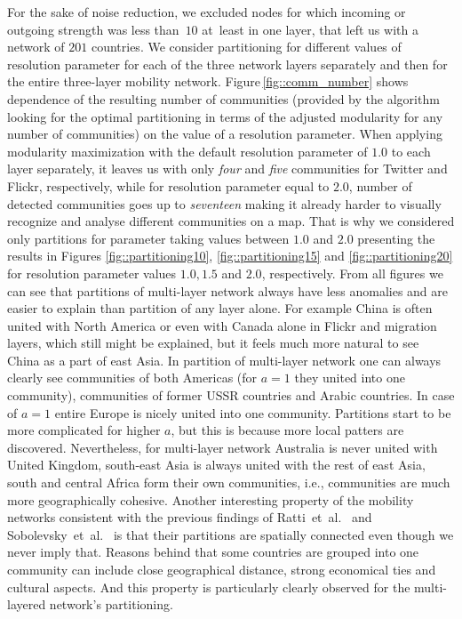 \documentclass[aps,superscriptaddress,showkeys,nofootinbib]{revtex4-1}
\begin{document}
For the sake of noise reduction, we excluded nodes for which incoming or outgoing strength was less than~$10$ at~least in one layer, that left us with a network of $201$ countries. We consider partitioning for different values of resolution parameter for each of the three network layers separately and then for the entire three-layer mobility network. Figure\,\ref{fig::comm_number} shows dependence of the resulting number of communities (provided by the algorithm looking for the optimal partitioning in terms of the adjusted modularity for any number of communities) on the value of a resolution parameter.
When applying modularity maximization with the default resolution parameter of $1.0$ to each layer separately, it leaves us with only \textit{four} and \textit{five} communities for Twitter and Flickr, respectively, while for resolution parameter equal to $2.0$, number of detected communities goes up to \textit{seventeen} making it already harder to visually recognize and analyse different communities on a map. That is why we considered only partitions for parameter taking values between $1.0$ and $2.0$ presenting the results in Figures \ref{fig::partitioning10}, \ref{fig::partitioning15} and \ref{fig::partitioning20} for resolution parameter values $1.0, 1.5$ and $2.0$, respectively. From all figures we can see that partitions of multi-layer network always have less anomalies and are easier to explain than partition of any layer alone.
For example China is often united with North America or even with Canada alone in Flickr and migration layers, which still might be explained, but it feels much more natural to see China as a part of east Asia. In partition of multi-layer network one can always clearly see communities of both Americas (for $a=1$ they united into one community), communities of former USSR countries and Arabic countries. In case of $a=1$ entire Europe is nicely united into one community. Partitions start to be more complicated for higher $a$, but this is because more local patters are discovered. Nevertheless, for multi-layer network Australia is never united with United Kingdom, south-east Asia is always united with the rest of east Asia, south and central Africa form their own communities, i.e., communities are much more geographically cohesive.
Another interesting property of the mobility networks consistent with the previous findings of Ratti~et~al.~\cite{ratti2010redrawing} and Sobolevsky~et~al.~\cite{sobolevsky2013delineating} is that their partitions are spatially connected even though we never imply that. Reasons behind that some countries are grouped into one community can include close geographical distance, strong economical ties and cultural aspects. And this property is particularly clearly observed for the multi-layered network's partitioning.
\end{document}
